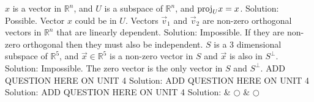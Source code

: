 \fi    
\ifnum {} %
    \setlength{\extrarowheight}{0.00cm} $x$ is a vector in $\mathbb R^n$, and $U$ is a subspace of $\mathbb R^n$, and $\text{proj}_U x = x$.
    \ifnum {} {\color{DarkBlue} Solution:  Possible. Vector $x$ could be in $U$. 
    } \fi
\fi    
\ifnum {} %
    \setlength{\extrarowheight}{0.00cm}  Vectors $\vec v_1$ and $\vec v_2$ are non-zero orthogonal vectors in $\mathbb R^n$ that are linearly dependent. 
    \ifnum {} {\color{DarkBlue} Solution:  Impossible. If they are non-zero orthogonal then they must also be independent. 
    } \fi
\fi    
\ifnum {}
    \setlength{\extrarowheight}{0.00cm} 
    $S$ is a 3 dimensional subspace of $\mathbb R^5$, and $\vec x \in \mathbb R^5$ is a non-zero vector in $S$ and $\vec x$ is also in $S^\perp$. 
    \ifnum {} {\color{DarkBlue} Solution:  Impossible. The zero vector is the only vector in $S$ and $S^\perp$.  
    } \fi
\fi     
\ifnum {} %
    \setlength{\extrarowheight}{0.00cm} ADD QUESTION HERE ON UNIT 4
    \ifnum {} {\color{DarkBlue} Solution:  
    } \fi
\fi    
\ifnum {} %
    \setlength{\extrarowheight}{0.00cm} ADD QUESTION HERE ON UNIT 4
    \ifnum {} {\color{DarkBlue} Solution:  
    } \fi
\fi    
\ifnum {} %
    \setlength{\extrarowheight}{0.00cm} ADD QUESTION HERE ON UNIT 4
    \ifnum {} {\color{DarkBlue} Solution:  
    } \fi
\fi    
& $\bigcirc$  & $\bigcirc$ \\     